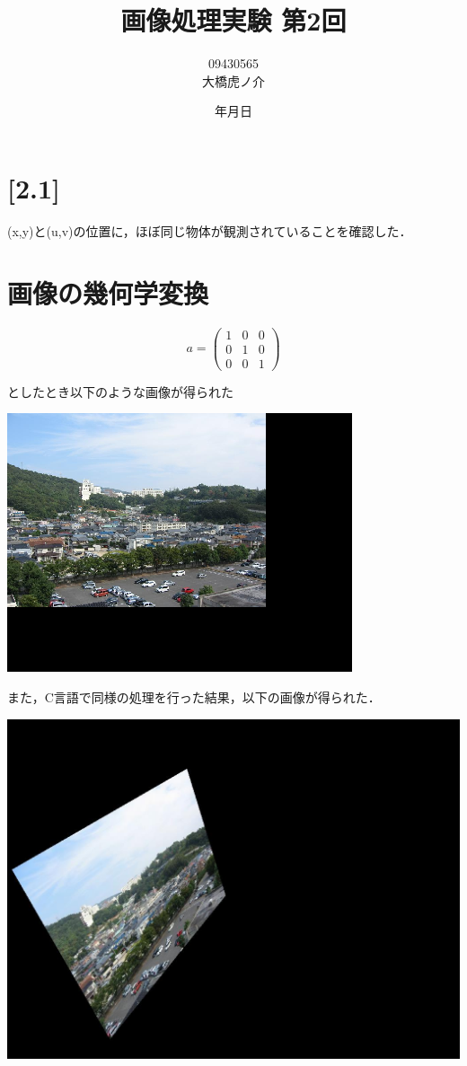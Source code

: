 \documentclass[11pt]{jarticle}
\begin{document}
\title{画像処理実験 第2回}
\author{09430565\\大橋虎ノ介}
\date{\number\year 年\number\month 月\number\day 日}
\maketitle

\section{[2.1]}
(x,y)と(u,v)の位置に，ほぼ同じ物体が観測されていることを確認した．

\section{画像の幾何学変換}

\[
  a = \left(
    \begin{array}{ccc}
      1 & 0 & 0 \\
      0 & 1 & 0 \\
      0 & 0 & 1
    \end{array}
  \right)
\]

としたとき以下のような画像が得られた

\includegraphics[scale=.5]{./img/download.png}

また，C言語で同様の処理を行った結果，以下の画像が得られた．

\includegraphics[scale=.5]{./img/c_henkan.jpg}
\end{document}

